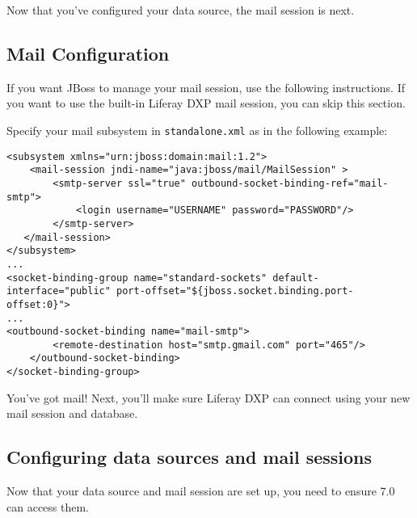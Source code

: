 Now that you've configured your data source, the mail session is next.

\subsection{Mail Configuration}\label{mail-configuration-1}

If you want JBoss to manage your mail session, use the following
instructions. If you want to use the built-in Liferay DXP mail session,
you can skip this section.

Specify your mail subsystem in \texttt{standalone.xml} as in the
following example:

\begin{verbatim}
<subsystem xmlns="urn:jboss:domain:mail:1.2">
    <mail-session jndi-name="java:jboss/mail/MailSession" >
        <smtp-server ssl="true" outbound-socket-binding-ref="mail-smtp">
            <login username="USERNAME" password="PASSWORD"/>
        </smtp-server>
   </mail-session>
</subsystem>
...
<socket-binding-group name="standard-sockets" default-interface="public" port-offset="${jboss.socket.binding.port-offset:0}">
...
<outbound-socket-binding name="mail-smtp">
        <remote-destination host="smtp.gmail.com" port="465"/>
    </outbound-socket-binding>
</socket-binding-group>
\end{verbatim}

You've got mail! Next, you'll make sure Liferay DXP can connect using
your new mail session and database.

\subsection{Configuring data sources and mail
sessions}\label{configuring-data-sources-and-mail-sessions-1}

Now that your data source and mail session are set up, you need to
ensure 7.0 can access them.

